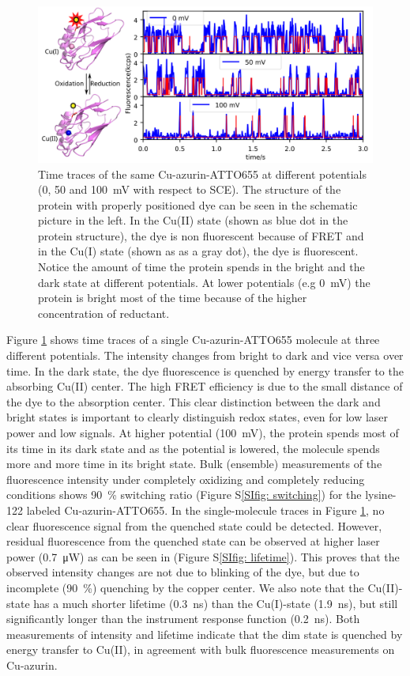 \begin{figure}
	\centering
	\includegraphics[width=\textwidth]{Figure_1_timetrace_CuAzu}
	\caption{Time traces of the same Cu-azurin-ATTO655 at different potentials (0, 50 and \SI{100}{\mV} with respect to SCE).
	The structure of the protein with properly positioned dye can be seen in the schematic picture in the left.
	In the Cu(II) state (shown as blue dot in the protein structure), the dye is non fluorescent because of FRET and in the Cu(I) state (shown as as a gray dot), the dye is fluorescent. Notice the amount of time the protein spends in the bright and the dark state at different potentials.
	At lower potentials (e.g \SI{0}{\mV}) the protein is bright most of the time because of the higher concentration of reductant.}
	\label{fig:timetrace}
\end{figure}


Figure \ref{fig:timetrace} shows time traces of a single Cu-azurin-ATTO655 molecule at three different potentials. 
The intensity changes from bright to dark and vice versa over time.
In the dark state, the dye fluorescence is quenched by energy transfer to the absorbing Cu(II) center\cite{kuznetsova2006a}.
The high FRET efficiency is due to the small distance of the dye to the absorption center.
This clear distinction between the dark and bright states is important to clearly distinguish redox states, even for low laser power and low signals.
At higher potential (\SI{100}{\mV}), the protein spends most of its time in its dark state and as the potential is lowered, the molecule spends more and more time in its bright state.
Bulk (ensemble) measurements of the fluorescence intensity under completely oxidizing and completely reducing conditions shows \SI{90}{\percent} switching ratio (Figure S\ref{SIfig: switching}) for the lysine-122 labeled Cu-azurin-ATTO655.\cite{nicolardi2012topdown}
In the single-molecule traces in Figure \ref{fig:timetrace}, no clear fluorescence signal from the quenched state could be detected.
However, residual fluorescence from the quenched state can be observed at higher laser power (\SI{0.7}{\uW}) as can be seen in (Figure S\ref{SIfig: lifetime}).
This proves that the observed intensity changes are not due to blinking of the dye, but due to incomplete (\SI{90}{\percent}) quenching by the copper center. 
We also note that the Cu(II)-state has a much shorter lifetime (\SI{0.3}{\ns}) than the Cu(I)-state (\SI{1.9}{\ns}), but still significantly longer than the instrument response function (\SI{0.2}{\ns}). 
Both measurements of intensity and lifetime indicate that the dim state is quenched by energy transfer to Cu(II), in agreement with bulk fluorescence measurements on Cu-azurin.


